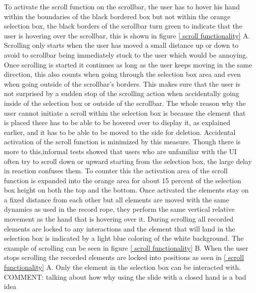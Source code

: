 To activate the scroll function on the scrollbar, the user has to hover his hand within the boundaries of the black bordered box but not within the orange selection box, the black borders of the scrollbar turn green to indicate that the user is hovering over the scrollbar, this is shown in figure \ref{ scroll functionality} A. Scrolling only starts when the user has moved a small distance up or down to avoid to scrollbar being immediately stuck to the user which would be annoying. Once scrolling is started it continues as long as the user keeps moving in the same direction, this also counts when going through the selection box area and even when going outside of the scrollbar's borders. This makes sure that the user is not surprised by a sudden stop of the scrolling action when accidentally going inside of the selection box or outside of the scrollbar. The whole reason why the user cannot initiate a scroll within the selection box is because the element that is placed there has to be able to be hovered over to display it, as explained earlier, and it has to be able to be moved to the side for deletion. Accidental activation of the scroll function is minimized by this measure. Though there is more to this,informal tests showed that users who are unfamiliar with the UI often try to scroll down or upward starting from the selection box, the large delay in reaction confuses them. To counter this the activation area of the scroll function is expanded into the orange area for about 15 percent of the selection box height on both the top and the bottom. Once activated the elements stay on a fixed distance from each other but all elements are moved with the same dynamics as used in the record rope, they perform the same vertical relative movement as the hand that is hovering over it. During scrolling all recorded elements are locked to any interactions and the element that will land in the selection box is indicated by a light blue coloring of the white background. The example of scrolling can be seen in figure \ref{ scroll functionality} B. When the user stops scrolling the recorded elements are locked into positions as seen in \ref{ scroll functionality} A. Only the element in the selection box can be interacted with.\\

{\large COMMENT: talking about how why using the slide with a closed hand is a bad idea} \\

